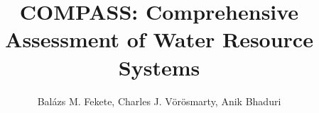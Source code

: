 \documentclass[landscape]{article}
\begin{document}
\title{COMPASS: Comprehensive Assessment of Water Resource Systems}

\author{Bal\'{a}zs M. Fekete,
 Charles J. V\"{o}r\"{o}smarty,
 Anik Bhaduri}

\maketitle

\pagebreak
\end{document}
